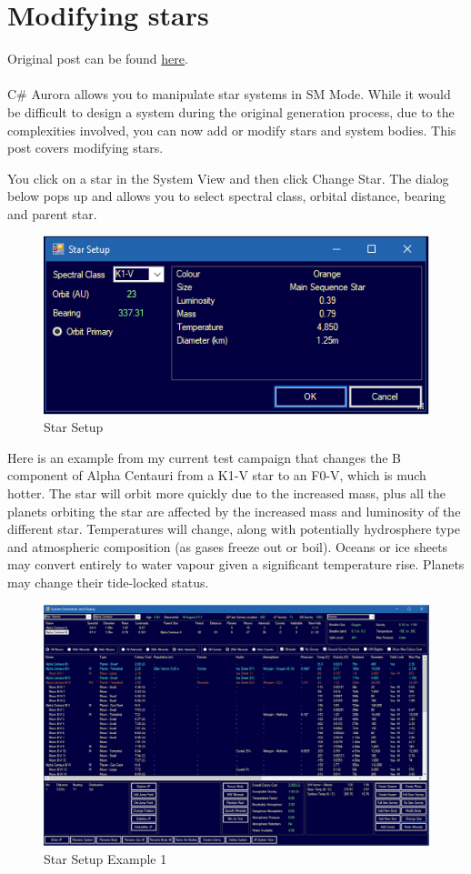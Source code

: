 \documentclass[../../Aurora C# unofficial manual.tex]{subfiles}
\begin{document}
	\section{Modifying stars}\label{1_modifying_stars}
	Original post can be found
	\href{http://aurora2.pentarch.org/index.php?topic=8495.msg118725#msg118725}{here}.
	\\\\
	
	C\# Aurora allows you to manipulate star systems in SM Mode. While it would be difficult to design a system during the original generation process, due to the complexities involved, you can now add or modify stars and system bodies. This post covers modifying stars.
	
	You click on a star in the System View and then click Change Star. The dialog below pops up and allows you to select spectral class, orbital distance, bearing and parent star.
	\begin{figure}[h]
		\centering
		\includegraphics[width=0.5\linewidth]{images/StarSetup}
		\caption[Star Setup]{Star Setup}
		\label{fig:starsetup}
	\end{figure}
	Here is an example from my current test campaign that changes the B component of Alpha Centauri from a K1-V star to an F0-V, which is much hotter. The star will orbit more quickly due to the increased mass, plus all the planets orbiting the star are affected by the increased mass and luminosity of the different star. Temperatures will change, along with potentially hydrosphere type and atmospheric composition (as gases freeze out or boil). Oceans or ice sheets may convert entirely to water vapour given a significant temperature rise. Planets may change their tide-locked status.
	\begin{figure}[H]
		\centering
		\includegraphics[width=0.95\linewidth]{images/StarSetupExample}
		\caption[Star Setup Example]{Star Setup Example 1}
		\label{fig:starsetupexample}
	\end{figure}
\end{document}

